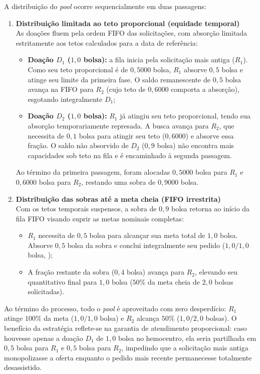 A distribuição do \textit{pool} ocorre sequencialmente em duas passagens:
\begin{enumerate}[label=\textbf{\arabic*ª Passagem:}, leftmargin=*]
  \item \textbf{Distribuição limitada ao teto proporcional (equidade temporal)} \\
  As doações fluem pela ordem FIFO das solicitações, com absorção limitada estritamente aos tetos calculados para a data de referência:
  \begin{itemize}
    \item \textbf{Doação $D_1$ ($1{,}0$ bolsa):} a fila inicia pela solicitação mais antiga ($R_1$). Como seu teto proporcional é de $0{,}5000$ bolsa, $R_1$ absorve $0{,}5$ bolsa e atinge seu limite da primeira fase. O saldo remanescente de $0{,}5$ bolsa avança na FIFO para $R_2$ (cujo teto de $0{,}6000$ comporta a absorção), esgotando integralmente $D_1$;
    \item \textbf{Doação $D_2$ ($1{,}0$ bolsa):} $R_1$ já atingiu seu teto proporcional, tendo sua absorção temporariamente represada. A busca avança para $R_2$, que necessita de $0{,}1$ bolsa para atingir seu teto ($0{,}6000$) e absorve essa fração. O saldo não absorvido de $D_2$ ($0{,}9$ bolsa) não encontra mais capacidades sob teto na fila e é encaminhado à segunda passagem.
  \end{itemize}
  Ao término da primeira passagem, foram alocadas $0{,}5000$ bolsa para $R_1$ e $0{,}6000$ bolsa para $R_2$, restando uma sobra de $0{,}9000$ bolsa.

  \item \textbf{Distribuição das sobras até a meta cheia (FIFO irrestrita)} \\
  Com os tetos temporais suspensos, a sobra de $0{,}9$ bolsa retorna ao início da fila FIFO visando suprir as metas nominais completas:
  \begin{itemize}
    \item $R_1$ necessita de $0{,}5$ bolsa para alcançar sua meta total de $1{,}0$ bolsa. Absorve $0{,}5$ bolsa da sobra e conclui integralmente seu pedido ($1{,}0 / 1{,}0$ bolsa, );
    \item A fração restante da sobra ($0{,}4$ bolsa) avança para $R_2$, elevando seu quantitativo final para $1{,}0$ bolsa ($50\%$ da meta cheia de $2{,}0$ bolsas solicitadas).
  \end{itemize}
\end{enumerate}

Ao término do processo, todo o \textit{pool} é aproveitado com zero desperdício: $R_1$ atinge $100\%$ da meta ($1{,}0/1{,}0$ bolsa) e $R_2$ alcança $50\%$ ($1{,}0/2{,}0$ bolsas). O benefício da estratégia reflete-se na garantia de atendimento proporcional: caso houvesse apenas a doação $D_1$ de $1{,}0$ bolsa no hemocentro, ela seria partilhada em $0{,}5$ bolsa para $R_1$ e $0{,}5$ bolsa para $R_2$, impedindo que a solicitação mais antiga monopolizasse a oferta enquanto o pedido mais recente permanecesse totalmente desassistido.

